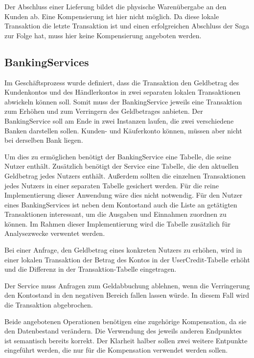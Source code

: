 Der Abschluss einer Lieferung bildet die physische Warenübergabe an den Kunden ab. Eine Kompensierung ist hier nicht möglich. Da diese lokale Transaktion die letzte Transaktion ist und einen erfolgreichen Abschluss der Saga zur Folge hat, muss hier keine Kompensierung angeboten werden.

\subsection{BankingServices}
Im Geschäftsprozess wurde definiert, dass die Transaktion den Geldbetrag des Kundenkontos und des Händlerkontos in zwei separaten lokalen Transaktionen abwickeln können soll. Somit muss der BankingService jeweils eine Transaktion zum Erhöhen und zum Verringern des Geldbetrages anbieten. Der BankingService soll am Ende in zwei Instanzen laufen, die zwei verschiedene Banken darstellen sollen. Kunden- und Käuferkonto können, müssen aber nicht bei derselben Bank liegen. 

Um dies zu ermöglichen benötigt der BankingService eine Tabelle, die seine Nutzer enthält. Zusätzlich benötigt der Service eine Tabelle, die den aktuellen Geldbetrag jedes Nutzers enthält. Außerdem sollten die einzelnen Transaktionen jedes Nutzers in einer separaten Tabelle gesichert werden. Für die reine Implementierung dieser Anwendung wäre dies nicht notwendig. Für den Nutzer eines BankingServices ist neben dem Kontostand auch die Liste an getätigten Transaktionen interessant, um die Ausgaben und Einnahmen zuordnen zu können. Im Rahmen dieser Implementierung wird die Tabelle zusätzlich für Analysezwecke verwentet werden.

Bei einer Anfrage, den Geldbetrag eines konkreten Nutzers zu erhöhen, wird in einer lokalen Transaktion der Betrag des Kontos in der UserCredit-Tabelle erhöht und die Differenz in der Transaktion-Tabelle eingetragen. 

Der Service muss Anfragen zum Geldabbuchung ablehnen, wenn die Verringerung den Kontostand in den negativen Bereich fallen lassen würde. In diesem Fall wird die Transaktion abgebrochen.

Beide angebotenen Operationen benötigen eine zugehörige Kompensation, da sie den Datenbestand verändern. Die Verwendung des jeweils anderen Endpunktes ist semantisch bereits korrekt. Der Klarheit halber sollen zwei weitere Entpunkte eingeführt werden, die nur für die Kompensation verwendet werden sollen.

